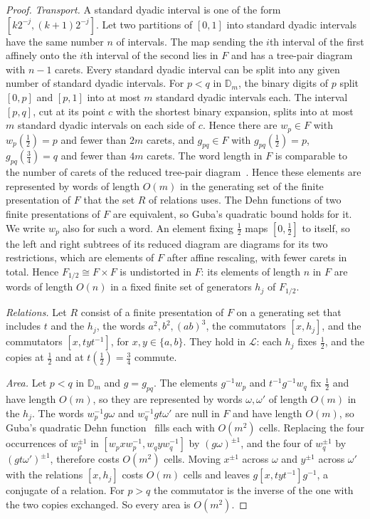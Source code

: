 \begin{proof}
\emph{Transport.} A standard dyadic interval is one of the form $[k2^{-j},(k+1)2^{-j}]$. Let two partitions of $[0,1]$ into standard dyadic
intervals have the same number $n$ of intervals. The map sending the $i$th interval of the first affinely onto the $i$th interval of the second
lies in $F$ and has a tree-pair diagram with $n-1$ carets. Every standard dyadic interval can be split into any given number of standard
dyadic intervals. For $p<q$ in $\mathbb D_m$, the binary digits of $p$ split $[0,p]$ and $[p,1]$ into at most $m$ standard dyadic
intervals each. The interval $[p,q]$, cut at its point $c$ with the shortest binary expansion, splits into at most $m$ standard dyadic intervals
on each side of $c$. Hence there are $w_p\in F$ with $w_p(\frac12)=p$ and fewer than $2m$ carets, and $g_{pq}\in F$ with $g_{pq}(\frac12)=p$, $g_{pq}(\frac34)=q$ and fewer than $4m$
carets. The word length in $F$ is comparable to the number of carets of the reduced tree-pair diagram~\cite{BCS2001}. Hence these elements
are represented by words of length $O(m)$ in the generating set of the finite presentation of $F$ that the set $R$ of relations uses. The Dehn
functions of two finite presentations of $F$ are equivalent, so Guba's quadratic bound holds for it. We write $w_p$ also for such a word. An
element fixing $\frac12$ maps $[0,\frac12]$ to itself, so the left and right subtrees of its reduced diagram are diagrams for its two
restrictions, which are elements of $F$ after affine rescaling, with fewer carets in total. Hence $F_{1/2}\cong F\times F$ is undistorted in
$F$: its elements of length $n$ in $F$ are words of length $O(n)$ in a fixed finite set of generators $h_j$ of $F_{1/2}$.

\emph{Relations.} Let $R$ consist of a finite presentation of $F$ on a generating set that includes $t$ and the $h_j$, the words
$a^2,b^2,(ab)^3$, the commutators $[x,h_j]$, and the commutators $[x,tyt^{-1}]$, for $x,y\in\{a,b\}$. They hold in $\mathcal L$: each $h_j$
fixes $\frac12$, and the copies at $\frac12$ and at $t(\frac12)=\frac34$ commute.

\emph{Area.} Let $p<q$ in $\mathbb D_m$ and $g=g_{pq}$. The elements $g^{-1}w_p$ and $t^{-1}g^{-1}w_q$ fix $\frac12$ and have length
$O(m)$, so they are represented by words $\omega,\omega'$ of length $O(m)$ in the $h_j$. The words $w_p^{-1}g\omega$ and $w_q^{-1}gt\omega'$ are null
in $F$
and have length $O(m)$, so Guba's quadratic Dehn function~\cite{Guba2006} fills each with $O(m^2)$ cells. Replacing the four
occurrences of $w_p^{\pm1}$ in $[w_pxw_p^{-1},w_qyw_q^{-1}]$ by $(g\omega)^{\pm1}$, and the four of $w_q^{\pm1}$ by $(gt\omega')^{\pm1}$, therefore
costs
$O(m^2)$ cells. Moving $x^{\pm1}$ across $\omega$ and $y^{\pm1}$ across $\omega'$ with the relations $[x,h_j]$ costs $O(m)$ cells and leaves
$g[x,tyt^{-1}]g^{-1}$, a conjugate of a relation. For $p>q$ the commutator is the inverse of the one with the two copies exchanged. So every
area is $O(m^2)$.


\end{proof}
